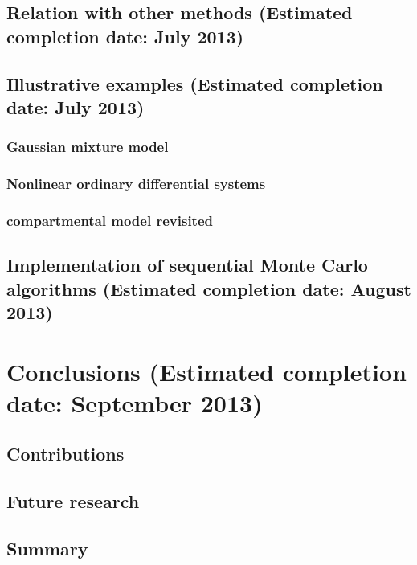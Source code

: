 \documentclass[11pt, fontset = Minion]{marticle}
\def\finish#1{(Estimated completion date: #1 2013)}
\begin{document}
\subsection{Relation with other methods \finish{July}}

\subsection{Illustrative examples \finish{July}}

\subsubsection{Gaussian mixture model}

\subsubsection{Nonlinear ordinary differential systems}

\subsubsection{\pet compartmental model revisited}

\subsection{Implementation of sequential Monte Carlo algorithms
  \finish{August}}

\section{Conclusions \finish{September}}

\subsection{Contributions}

\subsection{Future research}

\subsection{Summary}
\end{document}
